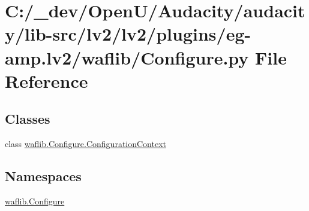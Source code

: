 \hypertarget{lv2_2plugins_2eg-amp_8lv2_2waflib_2_configure_8py}{}\section{C\+:/\+\_\+dev/\+Open\+U/\+Audacity/audacity/lib-\/src/lv2/lv2/plugins/eg-\/amp.lv2/waflib/\+Configure.py File Reference}
\label{lv2_2plugins_2eg-amp_8lv2_2waflib_2_configure_8py}
\subsection*{Classes}
\begin{DoxyCompactItemize}
\item 
class \hyperlink{classwaflib_1_1_configure_1_1_configuration_context}{waflib.\+Configure.\+Configuration\+Context}
\end{DoxyCompactItemize}
\subsection*{Namespaces}
\begin{DoxyCompactItemize}
\item 
 \hyperlink{namespacewaflib_1_1_configure}{waflib.\+Configure}
\end{DoxyCompactItemize}
